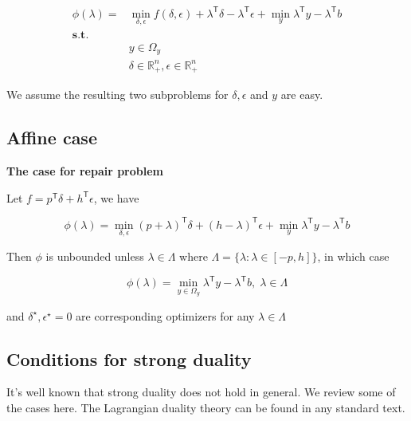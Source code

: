 \begin{equation}\label{eq:dual}
  \begin{aligned}
    \phi(\lambda) = & \min_{\delta, \epsilon} f(\delta, \epsilon) + \lambda^\mathsf{T}\delta - \lambda^\mathsf{T} \epsilon+ \min_y \lambda^\mathsf{T} y - \lambda^\mathsf{T} b \\
    \mathbf{s.t.}   &                                                                                                                                                          \\
                    & y \in \Omega_y                                                                                                                                           \\
                    & \delta \in \mathbb{R}^n_+ , \epsilon \in \mathbb{R}^n_+
  \end{aligned}
\end{equation}

We assume the resulting two subproblems for \(\delta, \epsilon\) and
\(y\) are easy.

\hypertarget{affine-case}{%
  \subsection{Affine case}\label{affine-case}}

\textbf{The case for repair problem}

Let \(f=p^\mathsf{T}\delta + h^\mathsf{T} \epsilon\), we have

\[\phi(\lambda) = \min_{\delta, \epsilon} (p+ \lambda)^\mathsf{T}\delta + (h - \lambda)^\mathsf{T} \epsilon+ \min_y \lambda^\mathsf{T} y - \lambda^\mathsf{T} b\]

Then \(\phi\) is unbounded unless \(\lambda \in \Lambda\) where
\(\Lambda = \{\lambda: \lambda \in [-p, h]\}\), in which case

\[\phi(\lambda) = \min_{y\in \Omega_y} \lambda^\mathsf{T} y - \lambda^\mathsf{T} b,\; \lambda\in \Lambda\]

and \(\delta^\star, \epsilon^\star = 0\) are corresponding optimizers
for any \(\lambda \in \Lambda\)

\hypertarget{conditions-for-strong-duality}{%
  \subsection{Conditions for strong
    duality}\label{conditions-for-strong-duality}}

It's well known that strong duality does not hold in general. We review
some of the cases here. The Lagrangian duality theory can be found in
any standard text.


